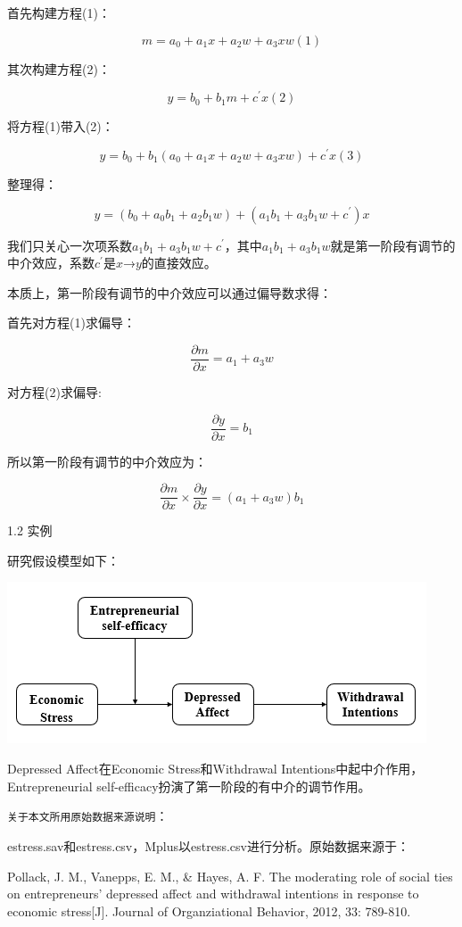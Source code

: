 \documentclass[
]{book}
\begin{document}
首先构建方程(1)：

\[
m=a_{0}+a_{1}x+a_{2}w+a_{3}xw(1)
\]

其次构建方程(2)：

\[
y=b_{0}+b_{1}m+c^{'}x(2)
\]

将方程(1)带入(2)：

\[
y=b_{0}+b_{1}(a_{0}+a_{1}x+a_{2}w+a_{3}xw)+c^{'}x(3)
\]

整理得：

\[
y=(b_{0}+a_{0}b_{1}+a_{2}b_{1}w)+(a_{1}b_{1}+a_{3}b_{1}w+c^{'})x
\]

我们只关心一次项系数\(a_{1}b_{1}+a_{3}b_{1}w+c^{'}\)，其中\(a_{1}b_{1}+a_{3}b_{1}w\)就是第一阶段有调节的中介效应，系数\(c^{'}\)是\(x\)→\(y\)的直接效应。

本质上，第一阶段有调节的中介效应可以通过偏导数求得：

首先对方程(1)求偏导：

\[
\frac{\partial m}{\partial x}=a_{1}+a_{3}w
\]

对方程(2)求偏导:

\[
\frac{\partial y}{\partial x}=b_{1}
\]

所以第一阶段有调节的中介效应为：

\[
\frac{\partial m}{\partial x} {\times} \frac{\partial y}{\partial x}=(a_{1}+a_{3}w)b_{1}
\]

1.2 实例

研究假设模型如下：

\includegraphics{figs/1142.png}

Depressed Affect在Economic Stress和Withdrawal
Intentions中起中介作用，Entrepreneurial self-efficacy扮演了第一阶段的有中介的调节作用。

\texttt{关于本文所用原始数据来源说明}：

estress.sav和estress.csv，Mplus以estress.csv进行分析。原始数据来源于：

Pollack, J. M., Vanepps, E. M., \& Hayes, A. F. The moderating role of social ties on entrepreneurs' depressed affect and withdrawal intentions in response to economic stress{[}J{]}. Journal of Organziational Behavior, 2012, 33: 789-810.
\end{document}
